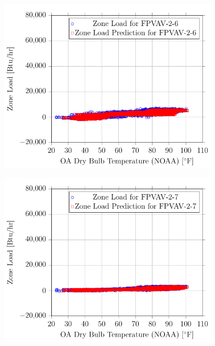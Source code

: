 \begin{figure}
\centering
\includegraphics[]{Plots/17/2017-06-27-1325-BtuhrvsOADryBulbTemperatureNOAAF.pdf}
\caption{}
\label{fig:2017-06-27-1325-BtuhrvsOADryBulbTemperatureNOAAF}
\end{figure}


\begin{figure}
\centering
\includegraphics[]{Plots/18/2017-06-27-1328-BtuhrvsOADryBulbTemperatureNOAAF.pdf}
\caption{}
\label{fig:2017-06-27-1328-BtuhrvsOADryBulbTemperatureNOAAF}
\end{figure}

